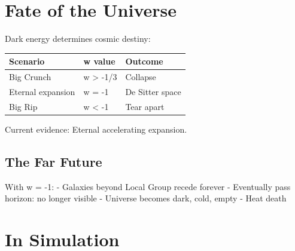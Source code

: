 \documentclass[
  11pt,
  letterpaper,
  twoside,
  openright]{book}
\begin{document}
\section{Fate of the Universe}\label{fate-of-the-universe}

Dark energy determines cosmic destiny:

\begin{longtable}[]{@{}lll@{}}
\toprule\noalign{}
Scenario & w value & Outcome \\
\midrule\noalign{}
\endhead
\bottomrule\noalign{}
\endlastfoot
Big Crunch & w \textgreater{} -1/3 & Collapse \\
Eternal expansion & w = -1 & De Sitter space \\
Big Rip & w \textless{} -1 & Tear apart \\
\end{longtable}

Current evidence: Eternal accelerating expansion.

\subsection{The Far Future}\label{the-far-future}

With w = -1: - Galaxies beyond Local Group recede forever - Eventually
pass horizon: no longer visible - Universe becomes dark, cold, empty -
Heat death

\section{In Simulation}\label{in-simulation-20}
\end{document}
